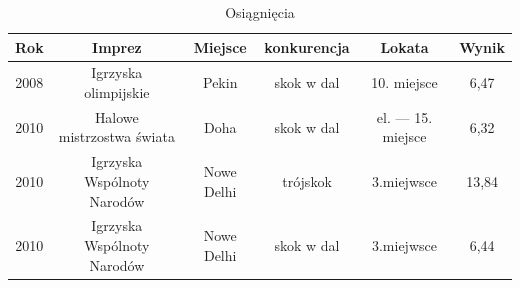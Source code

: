 \documentclass[a4paper,12pt]{article}
\begin{document}
\begin{table}
\begin {tabular}{cccccc}
Rok & Imprez & Miejsce & konkurencja & Lokata & Wynik\\
\hline
2008 & Igrzyska olimpijskie &  Pekin & skok w dal & 10. miejsce & 6,47\\
\hline
2010 & Halowe mistrzostwa świata & Doha & skok w dal & el. --- 15. miejsce & 6,32\\
\hline
2010 & Igrzyska Wspólnoty Narodów & Nowe Delhi & trójskok & 3.miejwsce & 13,84\\
\hline
2010 & Igrzyska Wspólnoty Narodów & Nowe Delhi & skok w dal & 3.miejwsce & 6,44\\

\end{tabular}
\caption{Osiągnięcia}
\end{table}
\end{document}
